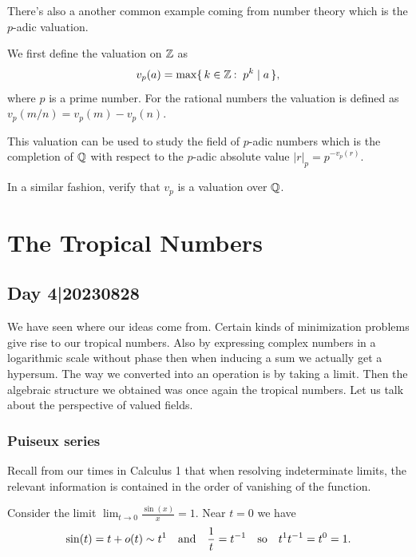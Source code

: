 \documentclass[12pt]{memoir}
\theoremstyle{definition}
\begin{document}
There's also a another common example coming from number theory which is the $p$-adic valuation. 

\begin{Ex}
    We first define the valuation on $\mathbb{Z}$ as 
    $$v_p(a)=\max\set{k\in\bZ\:\ p^k\mid a},$$
    where $p$ is a prime number. For the rational numbers the valuation is defined as $v_p(m/n)=v_p(m)-v_p(n)$.
\end{Ex}

This valuation can be used to study the field of $p$-adic numbers which is the completion of $\mathbb{Q}$ with respect to the $p$-adic absolute value $|r|_p=p^{-v_p(r)}$.

\begin{Ej}
In a similar fashion, verify that $v_p$ is a valuation over $\mathbb{Q}$.
\end{Ej}

\chapter{The Tropical Numbers}

\section{Day 4|20230828}

We have seen where our ideas come from. Certain kinds of minimization problems give rise to our tropical numbers. Also by expressing complex numbers in a logarithmic scale without phase then when inducing a sum we actually get a hypersum. The way we converted into an operation is by taking a limit. Then the algebraic structure we obtained was once again the tropical numbers. Let us talk about the perspective of valued fields.
\subsection{Puiseux series}
Recall from our times in Calculus 1 that when resolving indeterminate limits, the relevant information is contained in the order of vanishing of the function.

\begin{Ex}
    Consider the limit $\lim_{t\to 0}\frac{\sin(x)}{x}=1$. Near $t=0$ we have 
    $$\sin(t)=t+o(t)\sim t^1\quad\text{and}\quad\frac{1}{t}=t^{-1}\quad\text{so}\quad t^1t^{-1}=t^0=1.$$
\end{Ex}
\end{document}
